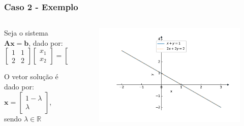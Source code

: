 \documentclass{beamer}
\theoremstyle{mystyle}
\begin{document}
\begin{frame}
	\frametitle{Caso 2 - Exemplo}
	\begin{columns}
		\begin{column}{0.4\textwidth} 
			Seja o sistema $ \mathbf{Ax} = \mathbf{b}$, dado por:
			\begin{equation*}
				\left[
				\begin{array}{cc}
					1 & 1 \\
					2 & 2 
				\end{array}
				\right] 
				\begin{bmatrix} x_{1} \\ x_{2} \end{bmatrix}
				=
				\begin{bmatrix} 1 \\ 2 \end{bmatrix}
			\end{equation*}
			
			O vetor solução é dado por: $ \mathbf{x} = \begin{bmatrix} 1 - \lambda \\ \lambda \end{bmatrix} $, sendo $ \lambda \in \mathbb{R} $
		\end{column}
		\begin{column}{0.6\textwidth}	
			\begin{figure}
				\centering
				\includegraphics[width=\linewidth]{Figuras/grafico_02}
				\label{fig:grafico_02}
			\end{figure}
		\end{column}
	\end{columns}
\end{frame}
\end{document}
